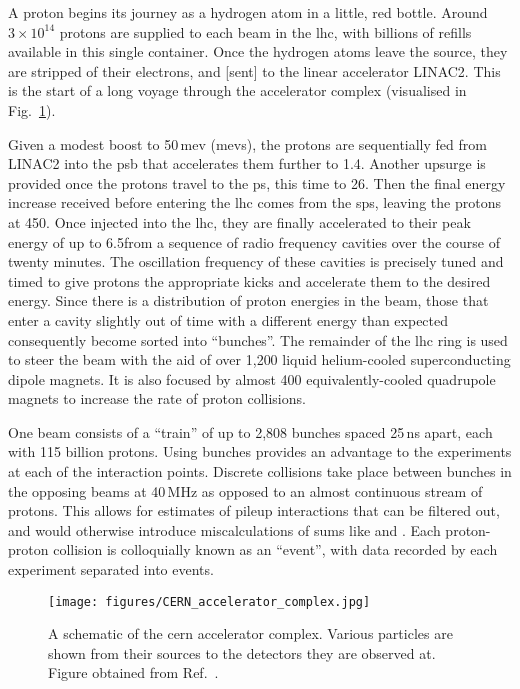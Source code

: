 A proton begins its journey as a hydrogen atom in a little, red bottle. Around $\text{3} \times \text{10}^{\text{14}}$ protons are supplied to each beam in the \acrshort{lhc}, with billions of refills available in this single container. Once the hydrogen atoms leave the source, they are stripped of their electrons, and [sent] to the linear accelerator LINAC2. This is the start of a long voyage through the accelerator complex (visualised in Fig.~\ref{fig:cern_accelerator_complex}).


Given a modest boost to 50\,\acrshort{mev} (\acrlong{mev}s), the protons are sequentially fed from LINAC2 into the \acrfull{psb} that accelerates them further to 1.4\GeV. Another upsurge is provided once the protons travel to the \acrfull{ps}, this time to 26\GeV. Then the final energy increase received before entering the \acrshort{lhc} comes from the \acrfull{sps}, leaving the protons at 450\GeV. Once injected into the \acrshort{lhc}, they are finally accelerated to their peak energy of up to 6.5\TeV from a sequence of radio frequency cavities over the course of twenty minutes. The oscillation frequency of these cavities is precisely tuned and timed to give protons the appropriate kicks and accelerate them to the desired energy. Since there is a distribution of proton energies in the beam, those that enter a cavity slightly out of time with a different energy than expected consequently become sorted into ``bunches''. The remainder of the \acrshort{lhc} ring is used to steer the beam with the aid of over 1,200 liquid helium-cooled superconducting dipole magnets. It is also focused by almost 400 equivalently-cooled quadrupole magnets to increase the rate of proton collisions.

One beam consists of a ``train'' of up to 2,808 bunches spaced 25\,ns apart, each with 115 billion protons. Using bunches provides an advantage to the experiments at each of the interaction points. Discrete collisions take place between bunches in the opposing beams at 40\,MHz as opposed to an almost continuous stream of protons. This allows for estimates of \gls{pileup} interactions that can be filtered out, and would otherwise introduce miscalculations of sums like \ptmiss and \HT. Each proton-proton collision is colloquially known as an ``event'', with data recorded by each experiment separated into events.

\begin{figure}[htbp]
    \centering
    \texttt{[image: figures/CERN\_accelerator\_complex.jpg]}
    \caption[A schematic of the \acrshort{cern} accelerator complex]{A schematic of the \acrshort{cern} accelerator complex. Various particles are shown from their sources to the detectors they are observed at. Figure obtained from Ref.~.}
    \label{fig:cern_accelerator_complex}
\end{figure}


